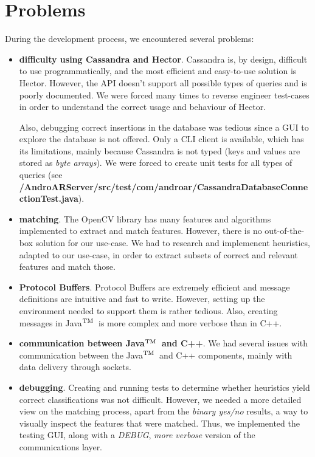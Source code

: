 \documentclass[a4paper,onecolumn,oneside,titlepage,11pt]{report}
\def\tm{\leavevmode\hbox{$\rm {}^{TM}$}}
\begin{document}
\section{Problems}
During the development process, we encountered several problems:
\begin{itemize}
	\item \textbf{difficulty using Cassandra and Hector}. Cassandra is, by design, difficult to use programmatically, and the most efficient and easy-to-use solution is Hector. However, the API doesn't support all possible types of queries and is poorly documented. We were forced many times to reverse engineer test-cases in order to understand the correct usage and behaviour of Hector. 
	
	Also, debugging correct insertions in the database was tedious since a GUI to explore the database is not offered. Only a CLI client is available, which has its limitations, mainly because Cassandra is not typed (keys and values are stored as \emph{byte arrays}). We were forced to create unit tests for all types of queries (see \textbf{/AndroARServer/src/test/com/androar/CassandraDatabaseConnectionTest.java}).
	\item \textbf{matching}. The OpenCV library has many features and algorithms implemented to extract and match features. However, there is no out-of-the-box solution for our use-case. We had to research and implemenent heuristics, adapted to our use-case, in order to extract subsets of correct and relevant features and match those.
	\item \textbf{Protocol Buffers}. Protocol Buffers are extremely efficient and message definitions are intuitive and fast to write. However, setting up the environment needed to support them is rather tedious. Also, creating messages in Java\tm\ is more complex and more verbose than in C++.
	\item \textbf{communication between Java\tm\ and C++}. We had several issues with communication between the Java\tm\ and C++ components, mainly with data delivery through sockets.
	\item \textbf{debugging}. Creating and running tests to determine whether heuristics yield correct classifications was not difficult. However, we needed a more detailed view on the matching process, apart from the \emph{binary yes/no} results, a way to visually inspect the features that were matched. Thus, we implemented the testing GUI, along with a \emph{DEBUG}, \emph{more verbose} version of the communications layer.
	

\end{itemize}
\end{document}
